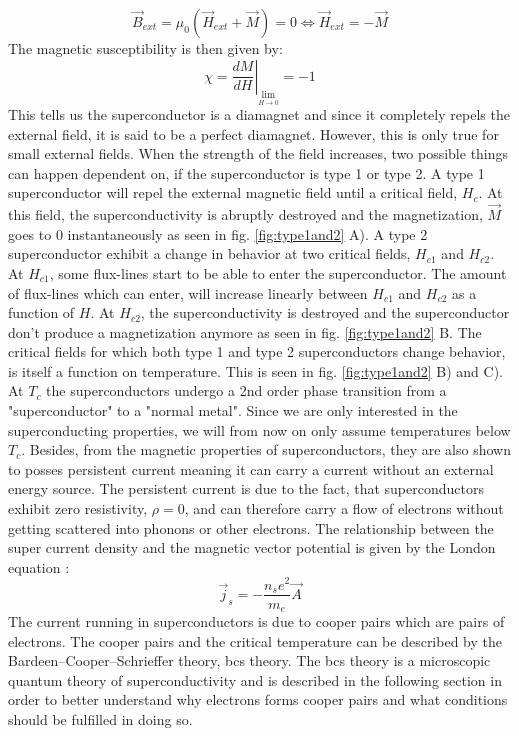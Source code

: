     \begin{equation}
        \Vec{B}_{ext}=\mu_0 (\Vec{H}_{ext} + \Vec{M}) = 0 \Leftrightarrow \Vec{H}_{ext} = - \Vec{M}
    \end{equation}
    The magnetic susceptibility is then given by: 
    \begin{equation}
        \chi=\left.\frac{d M}{d H}\right|_{\lim_{H\to 0}}= -1
    \end{equation}
    This tells us the superconductor is a diamagnet and since it completely repels the external field, it is said to be a perfect diamagnet. However, this is only true for small external fields. When the strength of the field increases, two possible things can happen dependent on, if the superconductor is type 1 or type 2. A type 1 superconductor will repel the external magnetic field until a critical field, $H_{c}$. At this field, the superconductivity is abruptly destroyed and the magnetization, $\Vec{M}$ goes to 0 instantaneously as seen in fig. \ref{fig:type1and2} A). A type 2 superconductor exhibit a change in behavior at two critical fields, $H_{c1}$ and $H_{c2}$. At $H_{c1}$, some flux-lines start to be able to enter the superconductor. The amount of flux-lines which can enter, will increase linearly between $H_{c1}$ and $H_{c2}$ as a function of $H$. At $H_{c2}$, the superconductivity is destroyed and the superconductor don't produce a magnetization anymore as seen in fig. \ref{fig:type1and2} B. The critical fields for which both type 1 and type 2 superconductors change behavior, is itself a function on temperature. This is seen in fig. \ref{fig:type1and2} B) and C). At $T_c$ the superconductors undergo a 2nd order phase transition from a "superconductor" to a "normal metal". Since we are only interested in the superconducting properties, we will from now on only assume temperatures below $T_c$. 
    \newline
    \newline
    Besides, from the magnetic properties of superconductors, they are also shown to posses persistent current meaning it can carry a current without an external energy source. The persistent current is due to the fact, that superconductors exhibit zero resistivity, $\rho = 0 $, and can therefore carry a flow of electrons without getting scattered into phonons or other electrons. The relationship between the super current density and the magnetic vector potential is given by the London equation \cite{Annett2004}:
    \begin{equation}
        \Vec{j}_s=-\frac{n_s e^2}{m_e} \Vec{A}
    \end{equation}
    The current running in superconductors is due to cooper pairs which are pairs of electrons. The cooper pairs and the critical temperature can be described by the Bardeen–Cooper–Schrieffer theory, \acrshort{bcs} theory. The \acrshort{bcs} theory is a microscopic quantum theory of superconductivity and is described in the following section in order to better understand why electrons forms cooper pairs and what conditions should be fulfilled in doing so. 
  

